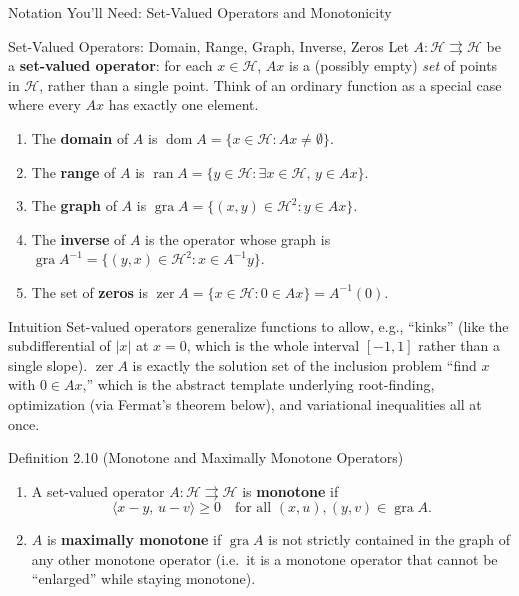 \documentclass[aspectratio=169,10pt]{beamer}
\DeclareMathOperator{\dom}{dom}
\DeclareMathOperator{\ran}{ran}
\DeclareMathOperator{\gra}{gra}
\DeclareMathOperator{\zer}{zer}
\begin{document}
\begin{frame}[allowframebreaks]{Notation You'll Need: Set-Valued Operators and Monotonicity}

  \begin{block}{Set-Valued Operators: Domain, Range, Graph, Inverse, Zeros}
    Let $A : \mathcal{H} \rightrightarrows \mathcal{H}$ be a
    \textbf{set-valued operator}: for each $x \in \mathcal{H}$, $Ax$ is a
    (possibly empty) \emph{set} of points in $\mathcal{H}$, rather than a
    single point. Think of an ordinary function as a special case where every
    $Ax$ has exactly one element.
    \begin{enumerate}
      \item[(1)] The \textbf{domain} of $A$ is
        $\dom A = \{x \in \mathcal{H} : Ax \ne \emptyset\}$.
      \item[(2)] The \textbf{range} of $A$ is
        $\ran A = \{y \in \mathcal{H} : \exists x \in \mathcal{H},\, y \in Ax\}$.
      \item[(3)] The \textbf{graph} of $A$ is
        $\gra A = \{(x,y) \in \mathcal{H}^2 : y \in Ax\}$.
      \item[(4)] The \textbf{inverse} of $A$ is the operator whose graph is
        $\gra A^{-1} = \{(y,x) \in \mathcal{H}^2 : x \in A^{-1}y\}$.
      \item[(5)] The set of \textbf{zeros} is
        $\zer A = \{x \in \mathcal{H} : 0 \in Ax\} = A^{-1}(0)$.
    \end{enumerate}
  \end{block}

  \begin{block}{Intuition}
    Set-valued operators generalize functions to allow, e.g., ``kinks''
    (like the subdifferential of $|x|$ at $x=0$, which is the whole interval
    $[-1,1]$ rather than a single slope). $\zer A$ is exactly the solution
    set of the inclusion problem ``find $x$ with $0 \in Ax$,'' which is the
    abstract template underlying root-finding, optimization (via Fermat's
    theorem below), and variational inequalities all at once.
  \end{block}

  \framebreak

  \begin{block}{Definition 2.10 (Monotone and Maximally Monotone Operators)}
    \begin{enumerate}
      \item[(1)] A set-valued operator $A : \mathcal{H} \rightrightarrows
        \mathcal{H}$ is \textbf{monotone} if
        \[
          \langle x-y,\, u-v\rangle \ge 0 \quad \text{for all } (x,u), (y,v) \in \gra A.
        \]
      \item[(2)] $A$ is \textbf{maximally monotone} if $\gra A$ is not
        strictly contained in the graph of any other monotone operator (i.e.\
        it is a monotone operator that cannot be ``enlarged'' while staying
        monotone).
    \end{enumerate}
  \end{block}


\end{frame}
\end{document}
